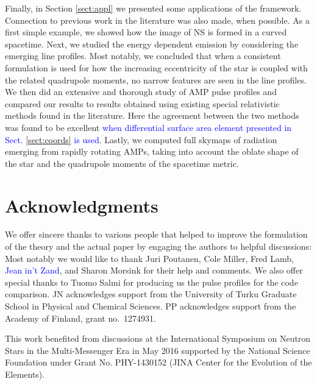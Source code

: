 \documentclass{aa}
\newcommand{\red}[1]{\textcolor{red}{#1}}
\newcommand{\refe}[1]{\textcolor{blue}{{#1}}}
\begin{document}
Finally, in Section \ref{sect:appl} we presented some applications of the framework.
Connection to previous work in the literature was also made, when possible.
As a first simple example, we showed how the image of NS is formed in a curved spacetime.
Next, we studied the energy dependent emission by considering the emerging line profiles.
Most notably, we concluded that when a consistent formulation is used for how the increasing eccentricity of the star is coupled with the related quadrupole moments, no narrow features are seen in the line profiles.
We then did an extensive and thorough study of AMP pulse profiles and compared our results to results obtained using existing special relativistic methods found in the literature.
Here the agreement between the two methods was found to be excellent \refe{when differential surface area element presented in Sect. \ref{sect:coords} is used}.
Lastly, we computed full skymaps of radiation emerging from rapidly rotating AMPs, taking into account the oblate shape of the star and the quadrupole moments of the spacetime metric.



\section*{Acknowledgments}

\small{
We offer sincere thanks to various people that helped to improve the formulation of the theory and the actual paper by engaging the authors to helpful discussions: 
Most notably we would like to thank Juri Poutanen, Cole Miller, Fred Lamb, \refe{Jean in't Zand}, and Sharon Morsink for their help and comments.
We also offer special thanks to Tuomo Salmi for producing us the pulse profiles for the code comparison.
JN acknowledges support from the University of Turku Graduate School in Physical and Chemical Sciences.
PP acknowledges support from the Academy of Finland, grant no.~1274931.

This work benefited from discussions at the International Symposium on Neutron Stars in the Multi-Messenger Era in May 2016 supported by the National Science Foundation under Grant No. PHY-1430152 (JINA Center for the Evolution of the Elements).
}




\end{document}
